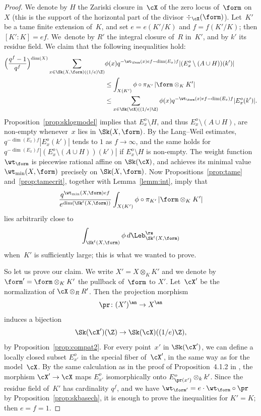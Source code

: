 \begin{proof}
We denote by $H$ the Zariski closure in~$\cX$ of the zero locus of~$\form$ on $X$ (this is the support of the horizontal part of the divisor $\div_{\cX}(\form)$).
Let~$K'$ be a tame finite extension of~$K$, and set $e=e(K'/K)$ and $f=f(K'/K)$; then $[K'\colon K]=ef$. We~denote by $R'$ the integral closure of~$R$ in~$K'$, and by $k'$ its residue field.
We claim that the following inequalities hold:
\begin{align*}
\Bigl(\frac{q^f-1}{q^f}\Bigr)^{\dim(X)} \sum_{x\in \Sk(X,\form)((1/e)\Z)}&\phi(x)q^{-\wt_{\form}(x)ef-\dim(E_x)f}|(E_x^o\setminus (A\cup H))(k')|
\\ & \leq \int_{X(K')}\phi\circ\pi_{K'}\,|\form\otimes_K K'|
\\
& \leq \sum_{x\in \Sk(\cX)((1/e)\Z)} \phi(x)q^{-\wt_{\form}(x)ef-\dim(E_x)f}|E_x^o(k')|.
\end{align*}
Proposition~\ref{prop:sklogmodel} implies that
$E^o_x\setminus H$, and thus $E^o_x\setminus (A\cup H)$, are non-empty whenever~$x$ lies in $\Sk(X,\form)$.
By the Lang--Weil estimates, $q^{-\dim(E_x)f}|E_x^o(k')|$ tends to $1$ as $f\to \infty$, and the same holds for $q^{-\dim(E_x)f}|(E_x^o\setminus (A\cup H))(k')|$ if $E_x^o\setminus H$ is non-empty. The weight function $\wt_{\form}$ is piecewise rational affine on $\Sk(\cX)$, and achieves its minimal value $\wt_{\min}(X,\form)$ precisely on $\Sk(X,\form)$.
Now Propositions~\ref{prop:tame} and~\ref{prop:tamecrit}, together with Lemma~\ref{lemm:int}, imply that
\[
\frac{q^{\wt_{\min}(X,\form)ef}}{e^{\dim(\Sk^t(X,\form))}}\int_{X(K')}\phi\circ\pi_{K'}\,|\form\otimes_K K'|
\]
lies arbitrarily close to
\[
\int_{\Sk^t(X,\form)}\phi\,d\Leb^{\rs}_{\Sk^t(X,\form)}
\]
when~$K'$ is sufficiently large; this is what we wanted to prove.

So let us prove our claim. We write $X'=X\otimes_K K'$ and we denote by $\form'=\form \otimes_K K'$ the pullback of~$\form$ to $X'$.
Let~$\cX'$ be the normalization of $\cX\otimes_R R'$. Then the projection morphism
\[
\pr\colon (X')^{\an}\to X^{\an}
\]
induces a bijection
\[
\Sk(\cX')(\Z)\to \Sk(\cX)((1/e)\Z),
\]
by Proposition~\ref{prop:compat2}. For every point~$x'$ in $\Sk(\cX')$, we can define a locally closed subset $E_{x'}^o$ in the special fiber of~$\cX'$, in the same way as for the model~$\cX$.
By the same calculation as in the proof of Proposition~4.1.2 in \cite{logzeta}, the morphism $\cX'\to \cX$
maps $E^o_{x'}$ isomorphically onto $E_{\pr(x')}^o\otimes_k k'$. Since the residue field of~$K'$ has cardinality $q^f$, and
we have $\wt_{\form'}=e\cdot \wt_{\form}\circ \pr$ by Proposition~\ref{prop:skbasech}, it is enough to prove the inequalities for $K'=K$; then $e=f=1$.


\end{proof}

